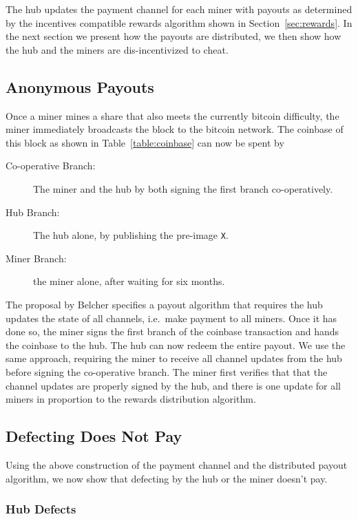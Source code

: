 \documentclass{article}
\begin{document}
The hub updates the payment channel for each miner with payouts as
determined by the incentives compatible rewards algorithm shown in
Section~\ref{sec:rewards}. In the next section we present how the
payouts are distributed, we then show how the hub and the miners are
dis-incentivized to cheat.

\subsection{Anonymous Payouts}

Once a miner mines a share that also meets the currently bitcoin
difficulty, the miner immediately broadcasts the block to the bitcoin
network. The coinbase of this block as shown in
Table~\ref{table:coinbase} can now be spent by

\begin{description}
\item[Co-operative Branch:] The miner and the hub by both signing the
  first branch co-operatively.
\item[Hub Branch:] The hub alone, by publishing the pre-image \verb|X|.
\item[Miner Branch:] the miner alone, after waiting for six months.
\end{description}

The proposal by Belcher specifies a payout algorithm that requires the
hub updates the state of all channels, i.e.\ make payment to all
miners. Once it has done so, the miner signs the first branch of the
coinbase transaction and hands the coinbase to the hub. The hub can
now redeem the entire payout. We use the same approach, requiring the
miner to receive all channel updates from the hub before signing the
co-operative branch. The miner first verifies that that the channel
updates are properly signed by the hub, and there is one update for
all miners in proportion to the rewards distribution algorithm.

\subsection{Defecting Does Not Pay}\label{ref:defecting}

Using the above construction of the payment channel and the
distributed payout algorithm, we now show that defecting by the hub or
the miner doesn't pay.

\subsubsection{Hub Defects}\label{ref:hub-defects}
\end{document}

